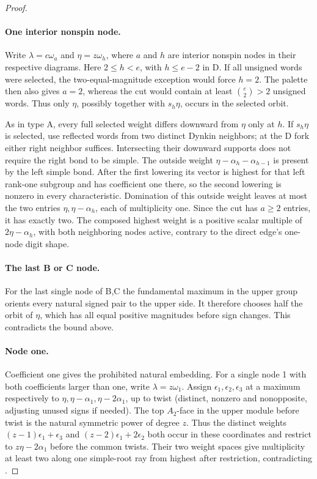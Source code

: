 \begin{proof}
\paragraph{One interior nonspin node.}
Write $\lambda=c\omega_a$ and $\eta=z\omega_h$, where $a$ and $h$
are interior nonspin nodes in their respective diagrams. Here
$2\le h<e$, with $h\le e-2$ in D. If all unsigned words were selected,
the two-equal-magnitude exception would force $h=2$. The palette then
also gives $a=2$, whereas the cut would contain at least
$\binom e2>2$ unsigned words. Thus only $\eta$, possibly together with
$s_h\eta$, occurs in the selected orbit.

As in type A, every full selected weight differs downward from $\eta$
only at $h$. If $s_h\eta$ is selected, use reflected words from two
distinct Dynkin neighbors; at the D fork either right neighbor suffices.
Intersecting their downward supports does not require the right bond
to be simple. The outside weight
$\eta-\alpha_h-\alpha_{h-1}$ is present by the left simple bond.
After the first lowering its vector is highest for that left rank-one
subgroup and has coefficient one there, so the second lowering is
nonzero in every characteristic. Domination of this outside weight
leaves at most the two entries $\eta,\eta-\alpha_h$, each of
multiplicity one. Since the cut has $a\ge2$ entries, it has exactly
two. The composed highest weight is a positive scalar multiple of
$2\eta-\alpha_h$, with both neighboring nodes active, contrary to
the direct edge's one-node digit shape.

\paragraph{The last B or C node.} For the last single node of B,C the fundamental maximum in the upper group orients every natural signed pair to the upper side. It therefore chooses half the orbit of \(\eta\), which has all equal positive magnitudes before sign changes. This contradicts the bound above.

\paragraph{Node one.} Coefficient one gives the prohibited natural embedding. For a single node 1 with both coefficients larger than one, write \(\lambda=z\omega_1\). Assign \(\epsilon_1,\epsilon_2,\epsilon_3\) at a maximum respectively to \(\eta,\eta-\alpha_1,\eta-2\alpha_1\), up to twist (distinct, nonzero and nonopposite, adjusting unused signs if needed). The top \(A_2\)-face in the upper module before twist is the natural symmetric power of degree \(z\). Thus the distinct weights \((z-1)\epsilon_1+\epsilon_3\) and \((z-2)\epsilon_1+2\epsilon_2\) both occur in these coordinates and restrict to $z\eta-2\alpha_1$ before the common twists. Their two weight spaces give multiplicity at least two along one simple-root ray from highest after restriction, contradicting .


\end{proof}

